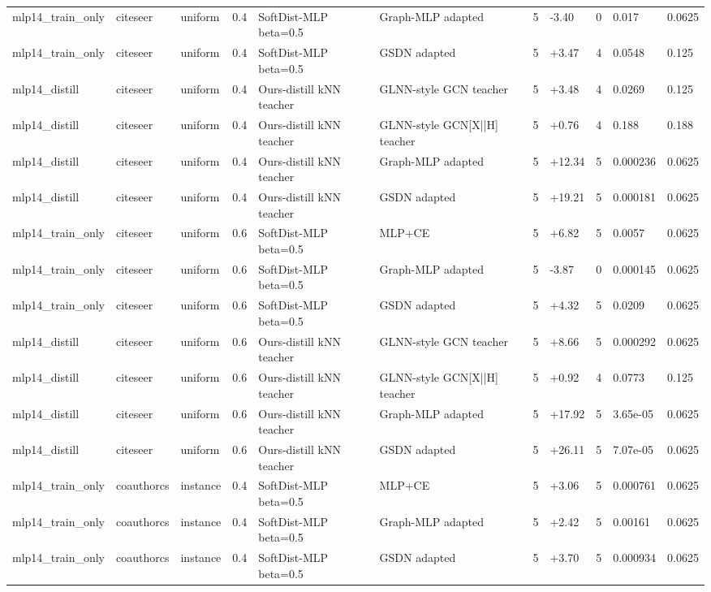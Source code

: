 \begin{table}[t]
\begin{tabular}{llllllrlrll}
mlp14_train_only & citeseer & uniform & 0.4 & SoftDist-MLP beta=0.5 & Graph-MLP adapted & 5 & -3.40 & 0 & 0.017 & 0.0625 \\
mlp14_train_only & citeseer & uniform & 0.4 & SoftDist-MLP beta=0.5 & GSDN adapted & 5 & +3.47 & 4 & 0.0548 & 0.125 \\
mlp14_distill & citeseer & uniform & 0.4 & Ours-distill kNN teacher & GLNN-style GCN teacher & 5 & +3.48 & 4 & 0.0269 & 0.125 \\
mlp14_distill & citeseer & uniform & 0.4 & Ours-distill kNN teacher & GLNN-style GCN[X||H] teacher & 5 & +0.76 & 4 & 0.188 & 0.188 \\
mlp14_distill & citeseer & uniform & 0.4 & Ours-distill kNN teacher & Graph-MLP adapted & 5 & +12.34 & 5 & 0.000236 & 0.0625 \\
mlp14_distill & citeseer & uniform & 0.4 & Ours-distill kNN teacher & GSDN adapted & 5 & +19.21 & 5 & 0.000181 & 0.0625 \\
mlp14_train_only & citeseer & uniform & 0.6 & SoftDist-MLP beta=0.5 & MLP+CE & 5 & +6.82 & 5 & 0.0057 & 0.0625 \\
mlp14_train_only & citeseer & uniform & 0.6 & SoftDist-MLP beta=0.5 & Graph-MLP adapted & 5 & -3.87 & 0 & 0.000145 & 0.0625 \\
mlp14_train_only & citeseer & uniform & 0.6 & SoftDist-MLP beta=0.5 & GSDN adapted & 5 & +4.32 & 5 & 0.0209 & 0.0625 \\
mlp14_distill & citeseer & uniform & 0.6 & Ours-distill kNN teacher & GLNN-style GCN teacher & 5 & +8.66 & 5 & 0.000292 & 0.0625 \\
mlp14_distill & citeseer & uniform & 0.6 & Ours-distill kNN teacher & GLNN-style GCN[X||H] teacher & 5 & +0.92 & 4 & 0.0773 & 0.125 \\
mlp14_distill & citeseer & uniform & 0.6 & Ours-distill kNN teacher & Graph-MLP adapted & 5 & +17.92 & 5 & 3.65e-05 & 0.0625 \\
mlp14_distill & citeseer & uniform & 0.6 & Ours-distill kNN teacher & GSDN adapted & 5 & +26.11 & 5 & 7.07e-05 & 0.0625 \\
mlp14_train_only & coauthorcs & instance & 0.4 & SoftDist-MLP beta=0.5 & MLP+CE & 5 & +3.06 & 5 & 0.000761 & 0.0625 \\
mlp14_train_only & coauthorcs & instance & 0.4 & SoftDist-MLP beta=0.5 & Graph-MLP adapted & 5 & +2.42 & 5 & 0.00161 & 0.0625 \\
mlp14_train_only & coauthorcs & instance & 0.4 & SoftDist-MLP beta=0.5 & GSDN adapted & 5 & +3.70 & 5 & 0.000934 & 0.0625 \\

\end{tabular}
\end{table}
